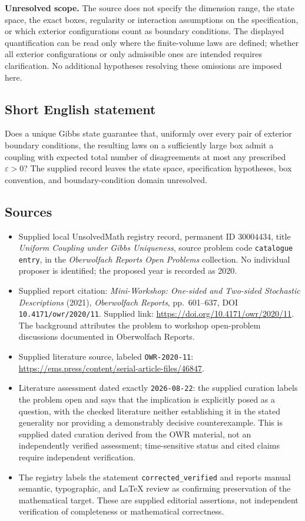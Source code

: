 \documentclass[11pt]{article}
\begin{document}
\textbf{Unresolved scope.} The source does not specify the dimension range, the state space, the exact boxes, regularity or interaction assumptions on the specification, or which exterior configurations count as boundary conditions. The displayed quantification can be read only where the finite-volume laws are defined; whether all exterior configurations or only admissible ones are intended requires clarification. No additional hypotheses resolving these omissions are imposed here.
\subsection{Short English statement}
Does a unique Gibbs state guarantee that, uniformly over every pair of exterior boundary conditions, the resulting laws on a sufficiently large box admit a coupling with expected total number of disagreements at most any prescribed \(\varepsilon>0\)? The supplied record leaves the state space, specification hypotheses, box convention, and boundary-condition domain unresolved.
\subsection{Sources}
\begin{itemize}
\item Supplied local UnsolvedMath registry record, permanent ID \(30004434\), title \emph{Uniform Coupling under Gibbs Uniqueness}, source problem code \texttt{catalogue entry}, in the \emph{Oberwolfach Reports Open Problems} collection. No individual proposer is identified; the proposed year is recorded as 2020.
\item Supplied report citation: \emph{Mini-Workshop: One-sided and Two-sided Stochastic Descriptions} (2021), \emph{Oberwolfach Reports}, pp.\ 601--637, DOI \texttt{10.4171/owr/2020/11}. Supplied link: \url{https://doi.org/10.4171/owr/2020/11}. The background attributes the problem to workshop open-problem discussions documented in Oberwolfach Reports.
\item Supplied literature source, labeled \texttt{OWR-2020-11}: \url{https://ems.press/content/serial-article-files/46847}.
\item Literature assessment dated exactly \texttt{2026-08-22}: the supplied curation labels the problem open and says that the implication is explicitly posed as a question, with the checked literature neither establishing it in the stated generality nor providing a demonstrably decisive counterexample. This is supplied dated curation derived from the OWR material, not an independently verified assessment; time-sensitive status and cited claims require independent verification.
\item The registry labels the statement \texttt{corrected\_verified} and reports manual semantic, typographic, and LaTeX review as confirming preservation of the mathematical target. These are supplied editorial assertions, not independent verification of completeness or mathematical correctness.
\end{itemize}
\end{document}
